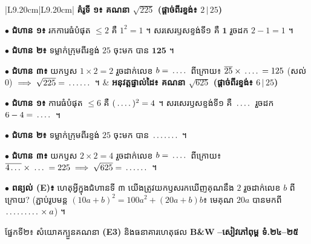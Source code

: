 \documentclass[a4paper,10pt]{article}
\newcommand{\en}[1]{{\TimesEn #1}}
\newcommand{\enbf}[1]{{\TimesEn\bfseries #1}}
\newcommand{\cnum}[1]{\mbox{\fontsize{10pt}{12pt}\selectfont\ding{\numexpr181+#1\relax}}}
\newcommand{\blank}[1][1.5cm]{\makebox[#1]{\dotfill}}
\newcommand{\secbar}[2]{%
  \begin{tcolorbox}[enhanced, sharp corners, colback=headgray, colframe=black, boxrule=0.9pt, boxsep=1pt, top=2pt, bottom=2pt, left=5pt, right=5pt, before skip=4pt, after skip=3pt]
    {\muol\fontsize{9.2pt}{13pt}\selectfont #1}\hfill{\fontsize{8pt}{11pt}\selectfont\textbf{#2}}
  \end{tcolorbox}%
}
\begin{document}
\begin{tabular}{|L{9.20cm}|L{9.20cm}|}
  \hline
  \textbf{គំរូទី ១៖ គណនា $\sqrt{225}$ (ផ្ដាច់ពីរខ្ទង់៖ $2\,|\,25$)}\par\vspace{2pt}
  $\bullet$ \textbf{ជំហាន ១៖} រកការេធំបំផុត $\le 2$ គឺ $1^2 = 1$ ។ សរសេរឫសខ្ទង់ទី១ គឺ $\mathbf{1}$ រួចដក $2 - 1 = 1$ ។\par\vspace{2pt}
  $\bullet$ \textbf{ជំហាន ២៖} ទម្លាក់ក្រុមពីរខ្ទង់ $25$ ចុះមក បាន $\mathbf{125}$ ។\par\vspace{2pt}
  $\bullet$ \textbf{ជំហាន ៣៖} យកឫស $1\times 2 = 2$ រួចដាក់លេខ $b=\blank[0.7cm]$ ពីក្រោយ៖ $\overline{25}\times \blank[0.7cm] = 125$ (សល់ $0$) $\implies \sqrt{225} = \mathbf{\blank[1.0cm]}$ ។
  &
  \textbf{អនុវត្តផ្ទាល់ដៃ៖ គណនា $\sqrt{625}$ (ផ្ដាច់ពីរខ្ទង់៖ $6\,|\,25$)}\par\vspace{2pt}
  $\bullet$ \textbf{ជំហាន ១៖} ការេធំបំផុត $\le 6$ គឺ $(\blank[0.7cm])^2 = 4$ ។ សរសេរឫសខ្ទង់ទី១ គឺ $\blank[0.7cm]$ រួចដក $6 - 4 = \blank[0.7cm]$ ។\par\vspace{2pt}
  $\bullet$ \textbf{ជំហាន ២៖} ទម្លាក់ក្រុមពីរខ្ទង់ $25$ ចុះមក បាន $\blank[1.1cm]$ ។\par\vspace{2pt}
  $\bullet$ \textbf{ជំហាន ៣៖} យកឫស $2\times 2 = 4$ រួចដាក់លេខ $b=\blank[0.7cm]$ ពីក្រោយ៖ $\overline{4\blank[0.5cm]}\times \blank[0.6cm] = 225 \implies \sqrt{625} = \mathbf{\blank[1.0cm]}$ ។ \\
  \hline
\end{tabular}

\vspace{3pt}
$\bullet$ \textbf{ពន្យល់ (\en{E})៖} ហេតុអ្វីក្នុងជំហានទី ៣ យើងត្រូវយកឫសរកឃើញគុណនឹង $2$ រួចដាក់លេខ $b$ ពីក្រោយ? (ភ្ជាប់រូបមន្ត $(10a+b)^2 = 100a^2 + (20a+b)b$៖ មេគុណ $20a$ បានមកពី $\blank[1.4cm]\times a$) ។

\secbar{ផ្នែកទី២៖ សំយោគក្បួនគណនា \enbf{(E3)} និងធនាគារហេតុផល \enbf{B\&W} \cnum{1}\enbf{--}\cnum{5}}{សៀវភៅពុម្ព ទំ.២៤–២៥}
\end{document}
